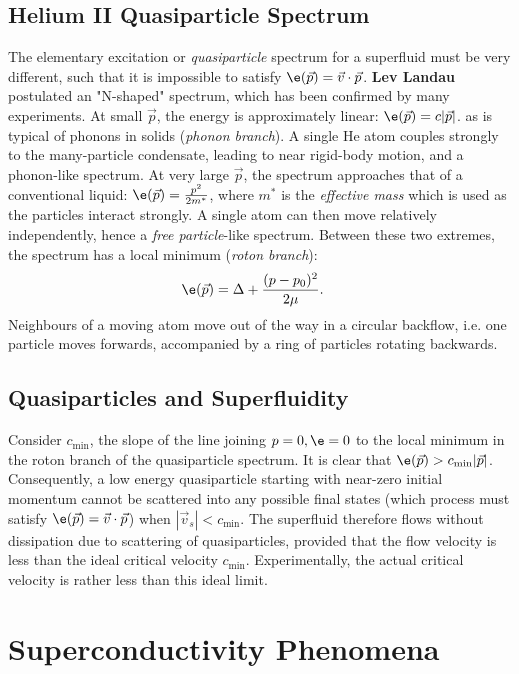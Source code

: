 \documentclass[qo.tex]{subfiles}
\begin{document}
\section{Helium II Quasiparticle Spectrum}
The elementary excitation or \emph{quasiparticle} spectrum for a superfluid must be very different, such that it is impossible to satisfy $\e(\vec{p})=\vec{v}\cdot\vec{p}$.
\textbf{Lev Landau} postulated an "N-shaped" spectrum, which has been confirmed by many experiments.
At small $\vec{p}$, the energy is approximately linear: $\e(\vec{p})=c|\vec{p}|$. as is typical of phonons in solids (\emph{phonon branch}).
A single He atom couples strongly to the many-particle condensate, leading to near rigid-body motion, and a phonon-like spectrum. 
At very large $\vec{p}$, the spectrum approaches that of a conventional liquid: $\e(\vec{p}) = \frac{p^2}{2m^*}$, where $m^*$ is the \emph{effective mass} which is used as the particles interact strongly.
A single atom can then move relatively independently, hence a \emph{free particle}-like spectrum.
Between these two extremes, the spectrum has a local minimum (\emph{roton branch}):
\begin{align}
    \e(\vec{p}) &= \Delta + \frac{(p-p_0)^2}{2\mu}.
\end{align}
Neighbours of a moving atom move out of the way in a circular backflow, i.e. one particle moves forwards, accompanied by a ring of particles rotating backwards.

\section{Quasiparticles and Superfluidity}
Consider $c_{\text{min}}$, the slope of the line joining $p=0,\e=0$ to the local minimum in the roton branch of the quasiparticle spectrum.
It is clear that $\e(\vec{p})>c_{\text{min}}|\vec{p}|$.
Consequently, a low energy quasiparticle starting with near-zero initial momentum cannot be scattered into any possible final states (which process must satisfy $\e(\vec{p})=\vec{v}\cdot\vec{p}$) when $|\vec{v}_s|<c_{\text{min}}$.
The superfluid therefore flows without dissipation due to scattering of quasiparticles, provided that the flow velocity is less than the ideal critical velocity $c_{\text{min}}$.
Experimentally, the actual critical velocity is rather less than this ideal limit.

\chapter{Superconductivity Phenomena}
\end{document}
